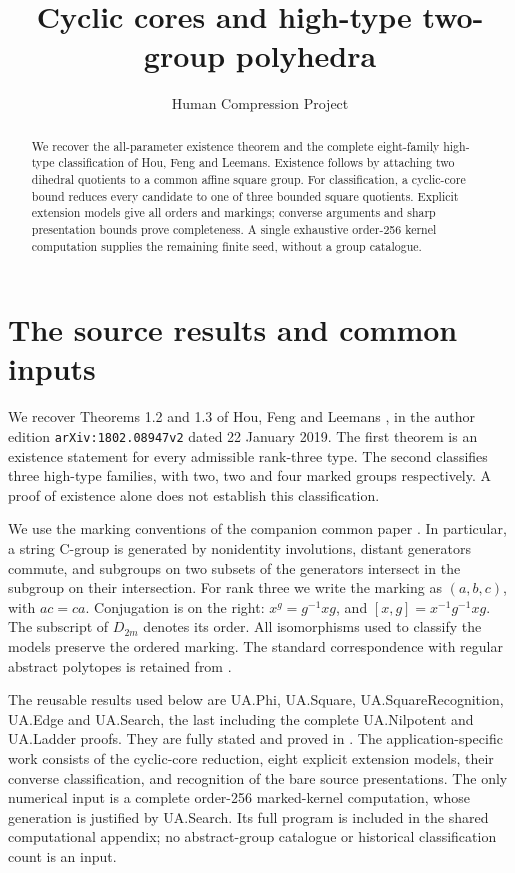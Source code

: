 
\usepackage{longtable,booktabs,array,calc}
\setlength{\emergencystretch}{4em}
\providecommand{\passthrough}[1]{#1}
\title{Cyclic cores and high-type two-group polyhedra}
\author{Human Compression Project}
\date{}

\maketitle
\begin{abstract}
We recover the all-parameter existence theorem and the complete eight-family
high-type classification of Hou, Feng and Leemans. Existence follows by
attaching two dihedral quotients to a common affine square group. For
classification, a cyclic-core bound reduces every candidate to one of
three bounded square quotients. Explicit extension models give all
orders and markings; converse arguments and sharp presentation bounds
prove completeness. A single exhaustive order-256 kernel computation
supplies the remaining finite seed, without a group catalogue.
\end{abstract}
\section{The source results and common inputs}
We recover Theorems 1.2 and 1.3 of Hou, Feng and Leemans
\cite{HFL}, in the author edition \nolinkurl{arXiv:1802.08947v2} dated
22 January 2019. The first theorem is an existence statement for every
admissible rank-three type. The second classifies three high-type
families, with two, two and four marked groups respectively. A proof of
existence alone does not establish this classification.

We use the marking conventions of the companion common paper
\cite{UA}. In particular, a string C-group is generated by nonidentity
involutions, distant generators commute, and subgroups on two subsets
of the generators intersect in the subgroup on their intersection.
For rank three we write the marking as $(a,b,c)$, with $ac=ca$.
Conjugation is on the right: $x^g=g^{-1}xg$, and
$[x,g]=x^{-1}g^{-1}xg$. The subscript of $D_{2m}$ denotes its order.
All isomorphisms used to classify the models preserve the ordered
marking. The standard correspondence with regular abstract polytopes
is retained from \cite[Section 2E]{MS}.

The reusable results used below are UA.Phi, UA.Square,
UA.SquareRecognition, UA.Edge and UA.Search, the last including the
complete UA.Nilpotent and UA.Ladder proofs. They are fully stated and
proved in \cite{UA}. The application-specific work consists of the
cyclic-core reduction, eight explicit extension models, their converse
classification, and recognition of the bare source presentations. The
only numerical input is a complete order-256 marked-kernel computation,
whose generation is justified by UA.Search. Its full program is included
in the shared computational appendix; no abstract-group catalogue or
historical classification count is an input.

